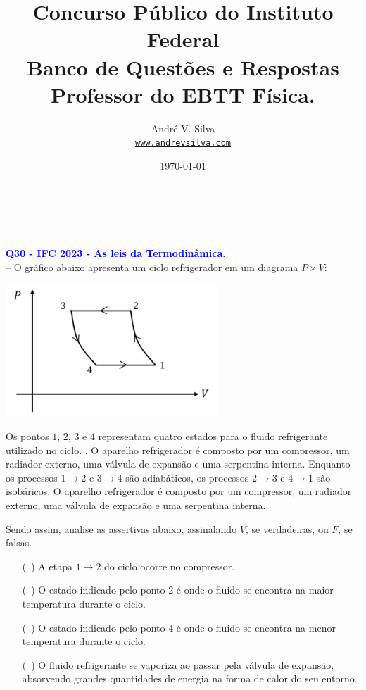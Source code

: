 \documentclass[a4paper,12pt]{article}
\title{Concurso Público do Instituto Federal \\ Banco de Questões e Respostas \\ Professor do EBTT \textbf{\large F\'isica}.}
\author{Andr\'e V. Silva \\ \texttt{\url{www.andrevsilva.com}}}
\date{\today}
\begin{document}
\maketitle

\justifying

\noindent\rule{\linewidth}{0.6pt}\\

\begin{flushleft}
\textbf{\textcolor{blue}{\Large Q30 - IFC 2023 - As leis da Termodinâmica.}}\\
\noindent
-- O gráfico abaixo apresenta um \colorbox{red!20}{ciclo refrigerador em um diagrama \( P \times V \):}

\begin{center}
\includegraphics[width=0.6\textwidth]{figures/ciclo_refrigerador.png}
\end{center}

Os pontos \(1\), \(2\), \(3\) e \(4\) representam quatro estados para o fluido refrigerante utilizado no ciclo.  
. O aparelho refrigerador é composto por um compressor, um radiador externo, uma válvula de expansão e uma serpentina interna.  
Enquanto os \colorbox{green!20}{processos \(1 \to 2\) e \(3 \to 4\) são adiabáticos}, \colorbox{blue!20}{os processos \(2 \to 3\) e \(4 \to 1\)} \colorbox{blue!20}{são isobáricos}.  O aparelho refrigerador é composto por um compressor, um radiador externo, uma válvula de expansão e uma serpentina interna.  

Sendo assim, analise as assertivas abaixo, assinalando \(V\), se verdadeiras, ou \(F\), se falsas.

\begin{itemize}
    \item[(\ )] A etapa \(1 \to 2\) do ciclo ocorre no compressor.
    \item[(\ )] O estado indicado pelo ponto \(2\) é onde o fluido se encontra na maior temperatura durante o ciclo.
    \item[(\ )] O estado indicado pelo ponto \(4\) é onde o fluido se encontra na menor temperatura durante o ciclo.
    \item[(\ )] O fluido refrigerante se vaporiza ao passar pela válvula de expansão, absorvendo grandes quantidades de energia na forma de calor do seu entorno.
\end{itemize}


\end{flushleft}
\end{document}
